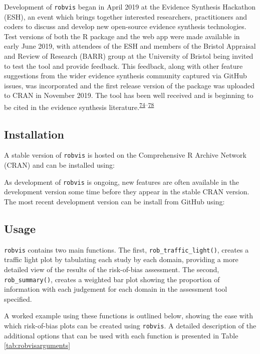 \documentclass[a4paper, twoside]{templates/ociamthesis}
\begin{document}
Development of \texttt{robvis} began in April 2019 at the Evidence Synthesis Hackathon (ESH), an event which brings together interested researchers, practitioners and coders to discuss and develop new open-source evidence synthesis technologies. Test versions of both the R package and the web app were made available in early June 2019, with attendees of the ESH and members of the Bristol Appraisal and Review of Research (BARR) group at the University of Bristol being invited to test the tool and provide feedback. This feedback, along with other feature suggestions from the wider evidence synthesis community captured via GitHub issues, was incorporated and the first release version of the package was uploaded to CRAN in November 2019. The tool has been well received and is beginning to be cited in the evidence synthesis literature.\textsuperscript{\protect\hyperlink{ref-gibb2019consistent}{74}--\protect\hyperlink{ref-tanneru2020}{78}}

\hypertarget{installation-1}{%
\subsection{Installation}\label{installation-1}}

A stable version of \texttt{robvis} is hosted on the Comprehensive R Archive Network (CRAN) and can be installed using:

As development of \texttt{robvis} is ongoing, new features are often available in the development version some time before they appear in the stable CRAN version. The most recent development version can be install from GitHub using:

\hypertarget{usage-1}{%
\subsection{Usage}\label{usage-1}}

\texttt{robvis} contains two main functions. The first, \texttt{rob\_traffic\_light()}, creates a traffic light plot by tabulating each study by each domain, providing a more detailed view of the results of the risk-of-bias assessment. The second, \texttt{rob\_summary()}, creates a weighted bar plot showing the proportion of information with each judgement for each domain in the assessment tool specified.

A worked example using these functions is outlined below, showing the ease with which risk-of-bias plots can be created using \texttt{robvis}. A detailed description of the additional options that can be used with each function is presented in Table \ref{tab:robvisarguments}
\end{document}
